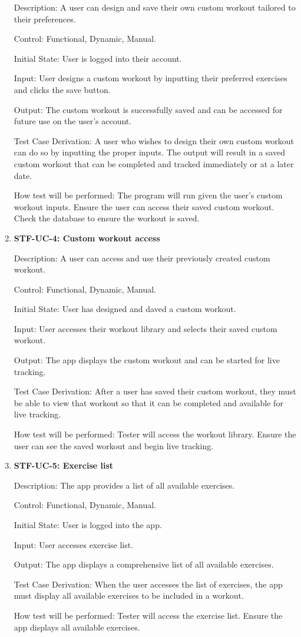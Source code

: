 \documentclass[12pt, titlepage]{article}
\begin{document}
\begin{enumerate}
Description: A user can design and save their own custom workout tailored to their preferences.
	
Control: Functional, Dynamic, Manual.

Initial State: User is logged into their account.

Input: User designs a custom workout by inputting their preferred exercises and clicks the save button.

Output: The custom workout is successfully saved and can be accessed for future use on the user’s account.

Test Case Derivation: A user who wishes to design their own custom workout can do so by inputting the proper inputs. The output will result in a saved custom workout that can be completed and tracked immediately or at a later date. 

How test will be performed: The program will run given the user’s custom workout inputs. Ensure the user can access their saved custom workout. Check the database to ensure the workout is saved.
 
\item{\textbf{STF-UC-4: Custom workout access}\\}

Description: A user can access and use their previously created custom workout. 
	
Control: Functional, Dynamic, Manual.

Initial State: User has designed and daved a custom workout.

Input: User accesses their workout library and selects their saved custom workout.

Output: The app displays the custom workout and can be started for live tracking.

Test Case Derivation: After a user has saved their custom workout, they must be able to view that workout so that it can be completed and available for live tracking. 

How test will be performed: Tester will access the workout library. Ensure the user can see the saved workout and begin live tracking. 
 
\item{\textbf{STF-UC-5: Exercise list}\\}

Description: The app provides a list of all available exercises.
	
Control: Functional, Dynamic, Manual.

Initial State: User is logged into the app.

Input: User accesses exercise list.

Output: The app displays a comprehensive list of all available exercises. 

Test Case Derivation: When the user accesses the list of exercises, the app must display all available exercises to be included in a workout.

How test will be performed: Tester will access the exercise list. Ensure the app displays all available exercises. 

\end{enumerate}
\end{document}
